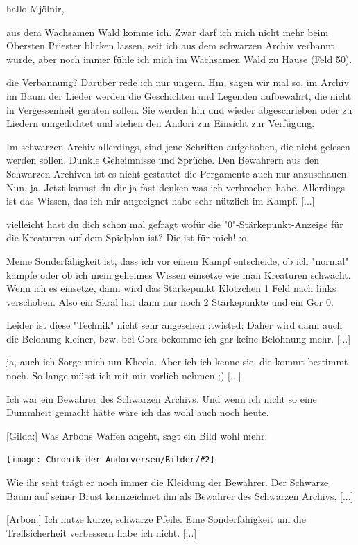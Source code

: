 \documentclass[10pt, a4paper, oneside]{book}
\newcommand{\bildmitts}[2][height=0.32\textwidth,width=0.48\textwidth,keepaspectratio]{%
    \begin{center}
        \texttt{[image: Chronik der Andorversen/Bilder/\#2]}
    \end{center}
}
\begin{document}
\begin{multicols}{2}
hallo Mjölnir,

aus dem Wachsamen Wald komme ich. Zwar darf ich mich nicht mehr beim Obersten Priester blicken lassen, seit ich aus dem schwarzen Archiv verbannt wurde, aber noch immer fühle ich mich im Wachsamen Wald zu Hause (Feld 50).

die Verbannung? Darüber rede ich nur ungern. Hm, sagen wir mal so, im Archiv im Baum der Lieder werden die Geschichten und Legenden aufbewahrt, die nicht in Vergessenheit geraten sollen. Sie werden hin und wieder abgeschrieben oder zu Liedern umgedichtet und stehen den Andori zur Einsicht zur Verfügung.

Im schwarzen Archiv allerdings, sind jene Schriften aufgehoben, die nicht gelesen werden sollen. Dunkle Geheimnisse und Sprüche. Den Bewahrern aus den Schwarzen Archiven ist es nicht gestattet die Pergamente auch nur anzuschauen. Nun, ja. Jetzt kannst du dir ja fast denken was ich verbrochen habe. Allerdings ist das Wissen, das ich mir angeeignet habe sehr nützlich im Kampf. [...]

vielleicht hast du dich schon mal gefragt wofür die "0"-Stärkepunkt-Anzeige für die Kreaturen auf dem Spielplan ist? Die ist für mich! :o

Meine Sonderfähigkeit ist, dass ich vor einem Kampf entscheide, ob ich "normal" kämpfe oder ob ich mein geheimes Wissen einsetze wie man Kreaturen schwächt. Wenn ich es einsetze, dann wird das Stärkepunkt Klötzchen 1 Feld nach links verschoben. Also ein Skral hat dann nur noch 2 Stärkepunkte und ein Gor 0.

Leider ist diese "Technik" nicht sehr angesehen :twisted: Daher wird dann auch die Belohung kleiner, bzw. bei Gors bekomme ich gar keine Belohnung mehr. [...]

ja, auch ich Sorge mich um Kheela. Aber ich ich kenne sie, die kommt bestimmt noch. So lange müsst ich mit mir vorlieb nehmen ;) [...]

Ich war ein Bewahrer des Schwarzen Archivs. Und wenn ich nicht so eine Dummheit gemacht hätte wäre ich das wohl auch noch heute.

[Gilda:] Was Arbons Waffen angeht, sagt ein Bild wohl mehr:

\bildmitts{NH Taverne Bild 2.jpg}

Wie ihr seht trägt er noch immer die Kleidung der Bewahrer. Der Schwarze Baum auf seiner Brust kennzeichnet ihn als Bewahrer des Schwarzen Archivs. [...]

[Arbon:] Ich nutze kurze, schwarze Pfeile. Eine Sonderfähigkeit um die Treffsicherheit verbessern habe ich nicht. [...]


\end{multicols}
\end{document}
